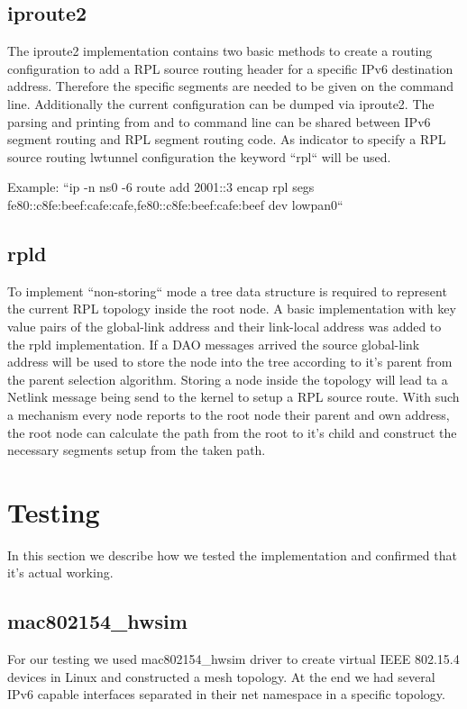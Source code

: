\documentclass[letterpaper]{article}
\begin{document}
\subsection{iproute2}

The iproute2 implementation contains two basic methods to create a routing
configuration to add a RPL source routing header for a specific IPv6 destination address.
Therefore the specific segments are needed to be given on the command line.
Additionally the current configuration can be dumped via iproute2.
The parsing and printing from and to command line can be shared between IPv6 segment routing and RPL segment routing code.
As indicator to specify a RPL source routing lwtunnel configuration the keyword ``rpl`` will be used.

Example: ``ip -n ns0 -6 route add 2001::3 encap rpl segs fe80::c8fe:beef:cafe:cafe,fe80::c8fe:beef:cafe:beef dev lowpan0``

\subsection{rpld}

To implement ``non-storing`` mode a tree data structure is required to represent the current RPL topology inside the root node.
A basic implementation with key value pairs of the global-link address and their link-local address was added to the rpld implementation.
If a DAO messages arrived the source global-link address will be used to store the node into the tree according to it's parent from the parent selection algorithm.
Storing a node inside the topology will lead ta a Netlink message being send to the kernel to setup a RPL source route.
With such a mechanism every node reports to the root node their parent and own address, the root node can calculate the path from the root to it's child and construct the necessary segments setup from the taken path.

\section{Testing}

In this section we describe how we tested the implementation and confirmed that it's actual working.

\subsection{mac802154\_hwsim}

For our testing we used mac802154\_hwsim driver to create virtual IEEE 802.15.4
devices in Linux and constructed a mesh topology.
At the end we had several IPv6 capable interfaces separated in their net namespace in a specific topology.
\end{document}
